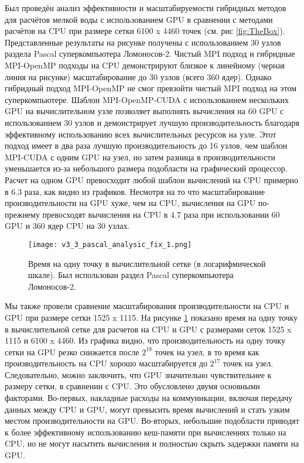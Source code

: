 Был проведён анализ эффективности и масштабируемости гибридных методов для расчётов мелкой воды с использованием GPU в сравнении с методами расчётов на CPU при размере сетки 6100 x 4460 точек (см. рис \ref{fig:TheBox}).
Представленные результаты на рисунке получены с использованием 30 узлов раздела Pascal суперкомпьютера Ломоносов-2. Чистый MPI подход и гибридные MPI-OpenMP подходы на CPU демонстрируют близкое к линейному (черная линия на рисунке) масштабирование до 30 узлов (всего 360 ядер).
Однако гибридный подход MPI-OpenMP не смог превзойти чистый MPI подход на этом суперкомпьютере. 
Шаблон MPI-OpenMP-CUDA с использованием нескольких GPU на вычислительном узле позволяет выполнять вычисления на 60 GPU с использованием 30 узлов и демонстрирует лучшую производительность благодаря эффективному использованию всех вычислительных ресурсов на узле.
Этот подход имеет в два раза лучшую производительность до 16 узлов, чем шаблон MPI-CUDA с одним GPU на узел, но затем разница в производительности уменьшается из-за небольшого размера подобласти на графический процессор.
Расчет на одном GPU превосходит любой шаблон вычислений на CPU примерно в 6.3 раза, как видно из графиков. 
Несмотря на то что масштабирование производительности на GPU хуже, чем на CPU, вычисления на GPU по-прежнему превосходят вычисления на CPU в 4.7 раза при использовании 60 GPU и 360 ядер CPU на 30 узлах.

\begin{figure}[!ht]
	\begin{minipage}{1\linewidth}
	\centering
	\texttt{[image: v3\_3\_pascal\_analysic\_fix\_1.png]}
	\end{minipage}
	\vspace{3pt}
	\caption{Время на одну точку в вычислительной сетке (в логарифмической шкале). Был использован раздел Pascal суперкомпьютера Ломоносов-2.}
	\label{fig:TheBox_full}
\end{figure}

Мы также провели сравнение масштабирования производительности на CPU и GPU при размере сетки 1525 x 1115.
На рисунке \ref{fig:TheBox_full} показано время на одну точку в вычислительной сетке для расчетов на CPU и GPU с размерами сеток 1525 x 1115 и 6100 x 4460.
Из графика видно, что производительность на одну точку сетки на GPU резко снижается после $2^{19}$ точек на узел, в то время как производительность на CPU хорошо масштабируется до $2^{17}$ точек на узел. 
Следовательно, можно заключить, что GPU значительно чувствительнее к размеру сетки, в сравнении с CPU.
Это обусловлено двумя основными факторами.
Во-первых, накладные расходы на коммуникации, включая передачу данных между CPU и GPU, могут превысить время вычислений и стать узким местом производительности на GPU.
Во-вторых, небольшие подобласти приводят к более эффективному использованию кеш-памяти при вычислениях только на CPU, но не могут насытить вычисления и полностью скрыть задержки памяти на GPU.

